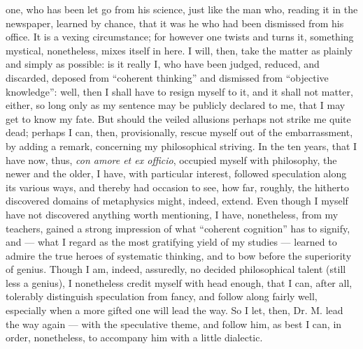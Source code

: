\documentclass[12pt]{book}
\begin{document}
one, who has been let go from his science, just like the man who, reading it in the newspaper, learned by chance, that it was he who had been dismissed from his office. It is a vexing circumstance; for however one twists and turns it, something mystical, nonetheless, mixes itself in here. I will, then, take the matter as plainly and simply as possible: is it really I, who have been judged, reduced, and discarded, deposed from ``coherent thinking'' and dismissed from ``objective knowledge'': well, then I shall have to resign myself to it, and it shall not matter, either, so long only as my sentence may be publicly declared to me, that I may get to know my fate. But should the veiled allusions perhaps not strike me quite dead; perhaps I can, then, provisionally, rescue myself out of the embarrassment, by adding a remark, concerning my philosophical striving. In the ten years, that I have now, thus, \textit{con amore et ex officio}, occupied myself with philosophy, the newer and the older, I have, with particular interest, followed speculation along its various ways, and thereby had occasion to see, how far, roughly, the hitherto discovered domains of metaphysics might, indeed, extend. Even though I myself have not discovered anything worth mentioning, I have, nonetheless, from my teachers, gained a strong impression of what ``coherent cognition'' has to signify, and --- what I regard as the most gratifying yield of my studies --- learned to admire the true heroes of systematic thinking, and to bow before the superiority of genius. Though I am, indeed, assuredly, no decided philosophical talent
(still less a genius), I nonetheless credit myself with head enough, that I can, after all, tolerably distinguish speculation from fancy, and follow along fairly well, especially when a more gifted one will lead the way. So I let, then, Dr. M. lead the way again --- with the speculative theme, and follow him, as best I can, in order, nonetheless, to accompany him with a little dialectic.
\end{document}

